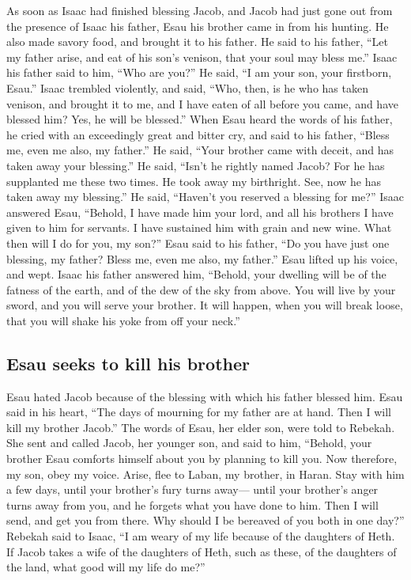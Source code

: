  As soon as Isaac had finished blessing Jacob, and Jacob
had just gone out from the presence of Isaac his father, Esau his
brother came in from his hunting.  He also made savory
food, and brought it to his father. He said to his father, ``Let my
father arise, and eat of his son's venison, that your soul may bless
me.''  Isaac his father said to him, ``Who are you?'' He
said, ``I am your son, your firstborn, Esau.''  Isaac
trembled violently, and said, ``Who, then, is he who has taken venison,
and brought it to me, and I have eaten of all before you came, and have
blessed him? Yes, he will be blessed.''  When Esau heard
the words of his father, he cried with an exceedingly great and bitter
cry, and said to his father, ``Bless me, even me also, my father.''
 He said, ``Your brother came with deceit, and has taken
away your blessing.''  He said, ``Isn't he rightly named
Jacob? For he has supplanted me these two times. He took away my
birthright. See, now he has taken away my blessing.'' He said, ``Haven't
you reserved a blessing for me?''  Isaac answered Esau,
``Behold, I have made him your lord, and all his brothers I have given
to him for servants. I have sustained him with grain and new wine. What
then will I do for you, my son?''  Esau said to his
father, ``Do you have just one blessing, my father? Bless me, even me
also, my father.'' Esau lifted up his voice, and wept. 
Isaac his father answered him, ``Behold, your dwelling will be of the
fatness of the earth, and of the dew of the sky from above.
 You will live by your sword, and you will serve your
brother. It will happen, when you will break loose, that you will shake
his yoke from off your neck.''

\hypertarget{esau-seeks-to-kill-his-brother}{%
\subsection{Esau seeks to kill his
brother}\label{esau-seeks-to-kill-his-brother}}

 Esau hated Jacob because of the blessing with which his
father blessed him. Esau said in his heart, ``The days of mourning for
my father are at hand. Then I will kill my brother Jacob.''
 The words of Esau, her elder son, were told to Rebekah.
She sent and called Jacob, her younger son, and said to him, ``Behold,
your brother Esau comforts himself about you by planning to kill you.
 Now therefore, my son, obey my voice. Arise, flee to
Laban, my brother, in Haran.  Stay with him a few days,
until your brother's fury turns away---  until your
brother's anger turns away from you, and he forgets what you have done
to him. Then I will send, and get you from there. Why should I be
bereaved of you both in one day?''  Rebekah said to
Isaac, ``I am weary of my life because of the daughters of Heth. If
Jacob takes a wife of the daughters of Heth, such as these, of the
daughters of the land, what good will my life do me?''

